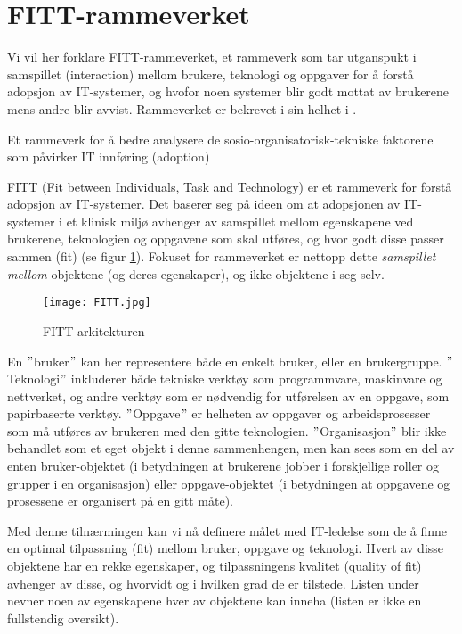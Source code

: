 \section{FITT-rammeverket}
\label{sec:fitt-remmeverket}

Vi vil her forklare FITT-rammeverket, et rammeverk som tar utganspukt i samspillet (interaction) mellom brukere, teknologi og oppgaver for å forstå adopsjon av IT-systemer, og hvofor noen systemer blir godt mottat av brukerene mens andre blir avvist. Rammeverket er bekrevet i sin helhet i \citep{FITT}.

Et rammeverk for å bedre analysere de sosio-organisatorisk-tekniske faktorene som påvirker IT innføring (adoption)

\noindent
FITT (Fit between Individuals, Task and Technology) er et rammeverk for forstå adopsjon av IT-systemer. Det baserer seg på ideen om at adopsjonen av IT-systemer i et klinisk miljø avhenger av samspillet mellom egenskapene ved brukerene, teknologien og oppgavene som skal utføres, og hvor godt disse passer sammen (fit) (se figur \ref{FITT-arkitekturen}). Fokuset for rammeverket er nettopp dette  \emph{samspillet mellom} objektene (og deres egenskaper), og ikke objektene i seg selv.

\begin{figure}[H]
\centering
\texttt{[image: FITT.jpg]}
\caption{FITT-arkitekturen}
\label{FITT-arkitekturen}
\end{figure}

\noindent
En $"$bruker$"$ kan her representere både en enkelt bruker, eller en brukergruppe. $"$Teknologi$"$ inkluderer både tekniske verktøy som programmvare, maskinvare og nettverket, og andre verktøy som er nødvendig for utførelsen av en oppgave, som papirbaserte verktøy. $"$Oppgave$"$ er helheten av oppgaver og arbeidsprosesser som må utføres av brukeren med den gitte teknologien. $"$Organisasjon$"$ blir ikke behandlet som et eget objekt i denne sammenhengen, men kan sees som en del av enten bruker-objektet (i betydningen at brukerene jobber i forskjellige roller og grupper i en organisasjon) eller oppgave-objektet (i betydningen at oppgavene og prosessene er organisert på en gitt måte).

\noindent
Med denne tilnærmingen kan vi nå definere målet med IT-ledelse som de å finne en optimal tilpassning (fit) mellom bruker, oppgave og teknologi.
Hvert av disse objektene har en rekke egenskaper, og tilpassningens kvalitet (quality of fit) avhenger av disse, og hvorvidt og i hvilken grad de er tilstede. Listen under nevner noen av egenskapene hver av objektene kan inneha (listen er ikke en fullstendig oversikt). 

